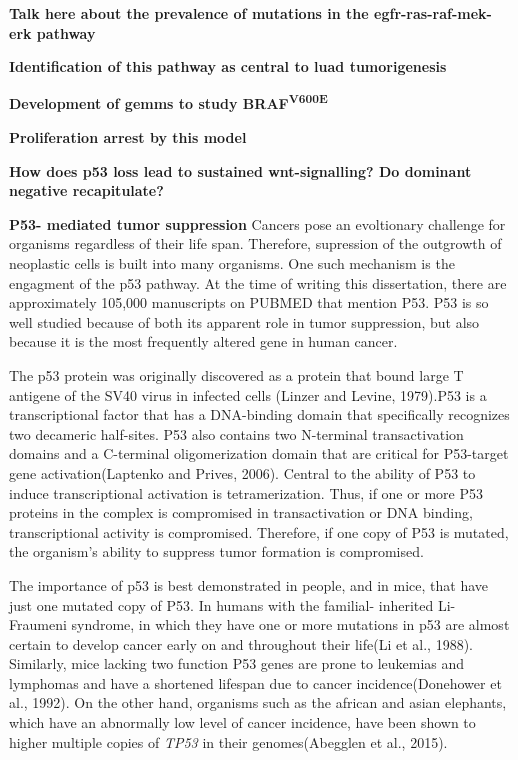 \textbf{Talk here about the prevalence of mutations in the egfr-ras-raf-mek-erk pathway}

\textbf{Identification of this pathway as central to luad tumorigenesis}

\textbf{Development of gemms to study BRAF\textsuperscript{V600E}}

\textbf{Proliferation arrest by this model}

\textbf{How does p53 loss lead to sustained wnt-signalling? Do dominant negative recapitulate?}

\textbf{P53- mediated tumor suppression}
Cancers pose an evoltionary challenge for organisms regardless of their life span. Therefore, supression of the outgrowth of neoplastic cells is built into many organisms. One such mechanism is the engagment of the p53 pathway. At the time of writing this dissertation, there are approximately 105,000 manuscripts on PUBMED that mention P53. P53 is so well studied because of both its apparent role in tumor suppression, but also because it is the most frequently altered gene in human cancer.

The p53 protein was originally discovered as a protein that bound large T antigene of the SV40 virus in infected cells (Linzer and Levine, 1979).P53 is a transcriptional factor that has a DNA-binding domain that specifically recognizes two decameric half-sites. P53 also contains two N-terminal transactivation domains and a C-terminal oligomerization domain that are critical for P53-target gene activation(Laptenko and Prives, 2006). Central to the ability of P53 to induce transcriptional activation is tetramerization. Thus, if one or more P53 proteins in the complex is compromised in transactivation or DNA binding, transcriptional activity is compromised. Therefore, if one copy of P53 is mutated, the organism's ability to suppress tumor formation is compromised.

The importance of p53 is best demonstrated in people, and in mice, that have just one mutated copy of P53. In humans with the familial- inherited Li-Fraumeni syndrome, in which they have one or more mutations in p53 are almost certain to develop cancer early on and throughout their life(Li et al., 1988). Similarly, mice lacking two function P53 genes are prone to leukemias and lymphomas and have a shortened lifespan due to cancer incidence(Donehower et al., 1992). On the other hand, organisms such as the african and asian elephants, which have an abnormally low level of cancer incidence, have been shown to higher multiple copies of \emph{TP53} in their genomes(Abegglen et al., 2015).

